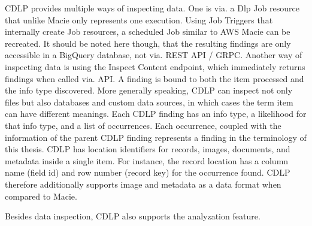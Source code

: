 CDLP provides multiple ways of inspecting data. One is via. a Dlp Job resource that unlike Macie only represents one execution. Using Job Triggers that internally create Job resources, a scheduled Job similar to AWS Macie can be recreated. It should be noted here though, that the resulting findings are only accessible in a BigQuery database, not via. REST API / GRPC.
Another way of inspecting data is using the Inspect Content endpoint, which immediately returns findings when called via. API. A finding is bound to both the item processed and the info type discovered. More generally speaking, CDLP can inspect not only files but also databases and custom data sources, in which cases the term item can have different meanings. Each CDLP finding has an info type, a likelihood for that info type, and a list of occurrences. Each occurrence, coupled with the information of the parent CDLP finding represents a finding in the terminology of this thesis. CDLP has location identifiers for records, images, documents, and metadata inside a single item. For instance, the record location has a column name (field id) and row number (record key) for the occurrence found. CDLP therefore additionally supports image and metadata as a data format when compared to Macie.


Besides data inspection, CDLP also supports the analyzation feature. 


